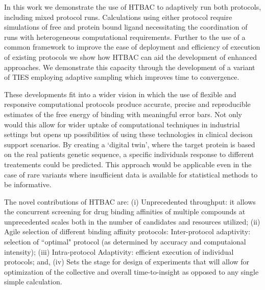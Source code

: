 In this work we demonstrate the use of HTBAC to adaptively run both protocols,
including mixed protocol runs. 
Calculations using either protocol require simulations of free and 
protein bound ligand necessitating the coordination of runs with 
heterogeneous computational requirements.
Further to the use of a common framework to improve the ease of deployment and
efficiency of execution of existing protocols we show how HTBAC can aid the
development of enhanced approaches. 
We demonstrate this capacity through the development of a variant of TIES 
employing adaptive sampling which improves time to convergence.


These developments fit into a wider vision in which the use of
flexible and responsive computational protocols produce accurate,
precise and reproducible estimates of the free energy of binding with meaningful error bars. Not only
would this allow for wider uptake of computational techniques in industrial
settings but opens up possibilities of using these technologies in clinical
decison support scenarios. By creating a `digital twin', where the target
protein is based on the real patients genetic sequence, a specific individuals
response to different treatements could be predicted. 
This approach would be
applicable even in the case of rare variants where insufficient data is
available for statistical methods to be informative.

The novel contributions of HTBAC are: (i) Unprecedented throughput: it allows
the concurrent screening for drug binding affinities of multiple compounds at
unprecedented scales both in the number of candidates and resources utilized;
(ii) Agile selection of different binding affinity protocols: Inter-protocol
adaptivity: selection of ``optimal" protocol (as determined by accuracy and
computaional intensity); (iii) Intra-protocol Adaptivity: efficient execution
of individual protocols; and, (iv) Sets the stage for design of experiments
that will allow for optimization of the collective and overall  
time-to-insight as opposed to any single simple calculation.

